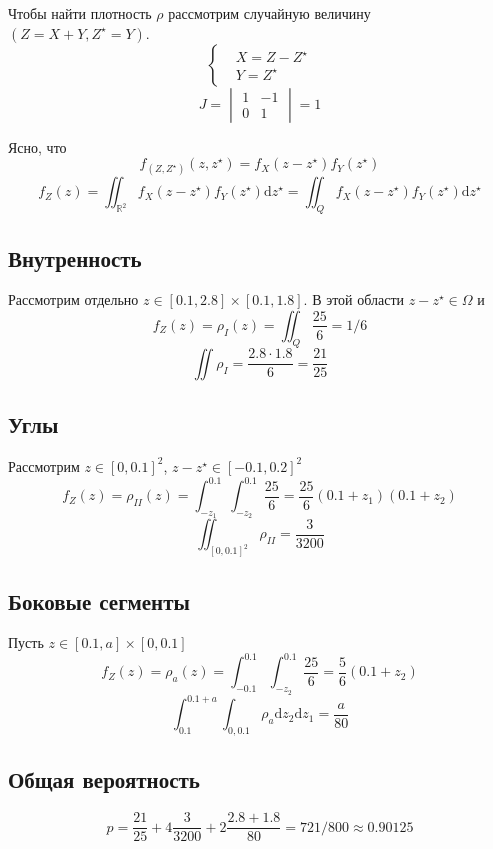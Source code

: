 \documentclass{article}
\providecommand{\RR}{\mathbb{R}}
\begin{document}
Чтобы найти плотность \( \rho \) рассмотрим случайную величину \( (Z=X+Y, Z^\star = Y ) \).
\[\left\{\begin{aligned}
    & X = Z - Z^\star \\
    & Y = Z^\star
\end{aligned}\right.\]
\[ J = \begin{vmatrix}
    1 & -1 \\
    0 & 1
\end{vmatrix} = 1 \]

Ясно, что
\[
    f_{(Z,Z^\star)}(z,z^\star) = f_X(z-z^\star) f_Y(z^\star)
\]
\[
    f_Z(z) = \iint_{\RR^2} f_X(z - z^\star) f_Y(z^\star) \mathrm{d} z^\star
    = \iint_Q f_X(z - z^\star) f_Y(z^\star) \mathrm{d} z^\star
\]

\subsection{Внутренность}
Рассмотрим отдельно \( z\in [0.1, 2.8]\times [0.1, 1.8] \).
В этой области \( z - z^\star \in \Omega \) и
\[
    f_Z(z) = \rho_I(z) = \iint_Q \frac{25}{6} = 1/6
\]
\[ \iint \rho_I = \frac{2.8\cdot 1.8}{6} = \frac{21}{25} \]

\subsection{Углы}
Рассмотрим \( z\in [0, 0.1]^2 \), \( z-z^\star \in [-0.1,0.2]^2 \)
\[
    f_Z(z) = \rho_{II}(z) = \int_{-z_1}^{0.1} \int_{-z_2}^{0.1} \frac{25}{6} = \frac{25}{6}(0.1+z_1)(0.1+z_2)
\]
\[
    \iint_{[0,0.1]^2} \rho_{II} = \frac{3}{3200}
    \]
\subsection{Боковые сегменты}
Пусть \( z\in [0.1, a]\times [0, 0.1] \)
\[
    f_Z(z) = \rho_{a}(z) = \int_{-0.1}^{0.1} \int_{-z_2}^{0.1} \frac{25}{6} = \frac{5}{6}(0.1 + z_2)
\]
\[
    \int_{0.1}^{0.1+a}\int_{0, 0.1} \rho_a \mathrm{d}z_2 \mathrm{d} z_1 = \frac{a}{80}
    \]

\subsection{Общая вероятность}
\[
    p = \frac{21}{25} + 4\frac{3}{3200} + 2\frac{2.8+1.8}{80} = 721/800 \approx 0.90125
    \]
\end{document}
